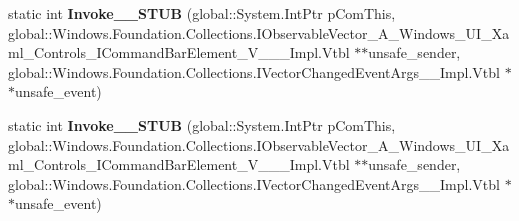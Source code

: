 \begin{DoxyCompactItemize}
\item 
\mbox{\label{struct_windows_1_1_foundation_1_1_collections_1_1_vector_changed_event_handler___a___windows___ud3b80c77359cead1f814fa39c92b857f_af67d541f15fac348d7b03bbc8e54eefc}} 
static int {\bfseries Invoke\+\_\+\+\_\+\+S\+T\+UB} (global\+::\+System.\+Int\+Ptr p\+Com\+This, global\+::\+Windows.\+Foundation.\+Collections.\+I\+Observable\+Vector\+\_\+\+A\+\_\+\+Windows\+\_\+\+U\+I\+\_\+\+Xaml\+\_\+\+Controls\+\_\+\+I\+Command\+Bar\+Element\+\_\+\+V\+\_\+\+\_\+\+\_\+\+Impl.\+Vtbl $\ast$$\ast$unsafe\+\_\+sender, global\+::\+Windows.\+Foundation.\+Collections.\+I\+Vector\+Changed\+Event\+Args\+\_\+\+\_\+\+Impl.\+Vtbl $\ast$$\ast$unsafe\+\_\+event)
\item 
\mbox{\label{struct_windows_1_1_foundation_1_1_collections_1_1_vector_changed_event_handler___a___windows___ud3b80c77359cead1f814fa39c92b857f_af67d541f15fac348d7b03bbc8e54eefc}} 
static int {\bfseries Invoke\+\_\+\+\_\+\+S\+T\+UB} (global\+::\+System.\+Int\+Ptr p\+Com\+This, global\+::\+Windows.\+Foundation.\+Collections.\+I\+Observable\+Vector\+\_\+\+A\+\_\+\+Windows\+\_\+\+U\+I\+\_\+\+Xaml\+\_\+\+Controls\+\_\+\+I\+Command\+Bar\+Element\+\_\+\+V\+\_\+\+\_\+\+\_\+\+Impl.\+Vtbl $\ast$$\ast$unsafe\+\_\+sender, global\+::\+Windows.\+Foundation.\+Collections.\+I\+Vector\+Changed\+Event\+Args\+\_\+\+\_\+\+Impl.\+Vtbl $\ast$$\ast$unsafe\+\_\+event)
\end{DoxyCompactItemize}
